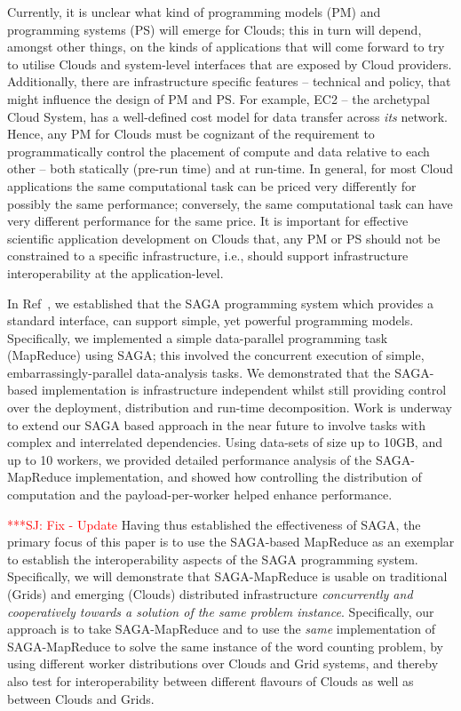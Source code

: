 \documentclass[3p,twocolumn]{elsarticle}
\newcommand{\jhanote}[1]{ {\textcolor{red} { ***SJ: #1 }}}
\newcommand{\jhanote}[1]{}
\newcommand{\sagamapreduce }{SAGA-MapReduce }
\begin{document}
Currently, it is unclear what kind of programming models (PM) and
programming systems (PS) will emerge for Clouds; this in turn will
depend, amongst other things, on the kinds of applications that will
come forward to try to utilise Clouds and system-level interfaces that
are exposed by Cloud providers.  Additionally, there are
infrastructure specific features -- technical and policy, that might
influence the design of PM and PS. For example, EC2 -- the archetypal
Cloud System, has a well-defined cost model for data transfer across
{\it its} network. Hence, any PM for Clouds must be cognizant of the
requirement to programmatically control the placement of compute and
data relative to each other -- both statically (pre-run time) and at
run-time.  In general, for most Cloud applications the same
computational task can be priced very differently for possibly the
same performance; conversely, the same computational task can have
very different performance for the same price. It is important for
effective scientific application development on Clouds that, any PM or
PS should not be constrained to a specific infrastructure, i.e.,
should support infrastructure interoperability at the
application-level.

In Ref~\cite{saga_ccgrid09}, we established that the SAGA programming
system which provides a standard interface, %
can support simple, yet powerful programming models.  Specifically, we
implemented a simple data-parallel programming task (MapReduce) using
SAGA; this involved the concurrent execution of simple,
embarrassingly-parallel data-analysis tasks.  We demonstrated that the
SAGA-based implementation is infrastructure independent whilst still
providing control over the deployment, distribution and run-time
decomposition.  Work is underway to extend our SAGA based approach in
the near future to involve tasks with complex and interrelated
dependencies.  Using data-sets of size up to 10GB, and up to 10
workers, we provided detailed performance analysis of the
SAGA-MapReduce implementation, and showed how controlling the
distribution of computation and the payload-per-worker helped enhance
performance.


\jhanote{Fix - Update}
Having thus established the effectiveness of SAGA, the primary focus
of this paper is to use the SAGA-based MapReduce as an exemplar to
establish the interoperability aspects of the SAGA programming system.
Specifically, we will demonstrate that \sagamapreduce is usable on
traditional (Grids) and emerging (Clouds) distributed infrastructure
{\it concurrently and cooperatively towards a solution of the same
  problem instance}.  Specifically, our approach is to take
\sagamapreduce and to use the {\it same} implementation of
\sagamapreduce to solve the same instance of the word counting
problem, by using different worker distributions over Clouds and Grid
systems, and thereby also test for interoperability between different
flavours of Clouds as well as between Clouds and Grids.
\end{document}
